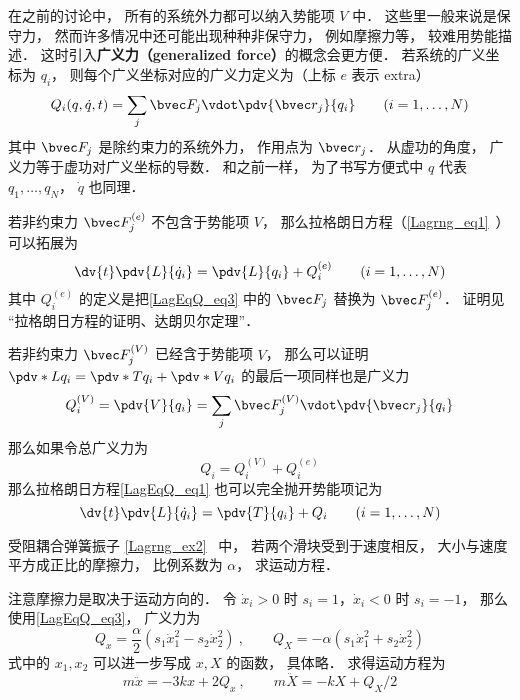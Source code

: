 

在之前的讨论中， 所有的系统外力都可以纳入势能项 $V$ 中． 这些里一般来说是保守力， 然而许多情况中还可能出现种种非保守力， 例如摩擦力等， 较难用势能描述． 这时引入\textbf{广义力（generalized force）}的概念会更方便． 若系统的广义坐标为 $q_i$， 则每个广义坐标对应的广义力定义为（上标 $e$ 表示 extra）
\begin{equation}\label{LagEqQ_eq3}
Q_i(q, \dot q, t) = \sum_j \bvec F_j \vdot \pdv{\bvec r_j}{q_i} \qquad (i=1,\dots,N)
\end{equation}
其中 $\bvec F_j$ 是除约束力的系统外力， 作用点为 $\bvec r_j$． 从虚功的角度， 广义力等于虚功对广义坐标的导数． 和之前一样， 为了书写方便式中 $q$ 代表 $q_1, \dots, q_N$， $\dot q$ 也同理．

若非约束力 $\bvec F_j^{(e)}$ 不包含于势能项 $V$， 那么拉格朗日方程（\autoref{Lagrng_eq1}~）可以拓展为
\begin{equation}\label{LagEqQ_eq1}
\dv{t} \pdv{L}{\dot q_i} = \pdv{L}{q_i} + Q_i^{(e)}
\qquad (i=1,\dots,N)
\end{equation}
其中 $Q_i^{(e)}$ 的定义是把\autoref{LagEqQ_eq3} 中的 $\bvec F_j$ 替换为 $\bvec F_j^{(e)}$． 证明见 “拉格朗日方程的证明、达朗贝尔定理”．

若非约束力 $\bvec F_j^{(V)}$ 已经含于势能项 $V$， 那么可以证明 $\pdv*{L}{q_i} = \pdv*{T}{q_i} + \pdv*{V}{q_i}$ 的最后一项同样也是广义力
\begin{equation}
Q_i^{(V)} = \pdv{V}{q_i} = \sum_j \bvec F_j^{(V)} \vdot \pdv{\bvec r_j}{q_i}
\end{equation}
那么如果令总广义力为
\begin{equation}
Q_i = Q_i^{(V)} + Q_i^{(e)}
\end{equation}
那么拉格朗日方程\autoref{LagEqQ_eq1} 也可以完全抛开势能项记为
\begin{equation}\label{LagEqQ_eq2}
\dv{t} \pdv{L}{\dot q_i} = \pdv{T}{q_i} + Q_i
\qquad (i=1,\dots,N)
\end{equation}

\begin{example}{受阻耦合弹簧振子}
\autoref{Lagrng_ex2}~ 中， 若两个滑块受到于速度相反， 大小与速度平方成正比的摩擦力， 比例系数为 $\alpha$， 求运动方程．

注意摩擦力是取决于运动方向的． 令 $\dot x_i > 0$ 时 $s_i = 1$，$\dot x_i < 0$ 时 $s_i = -1$， 那么使用\autoref{LagEqQ_eq3}， 广义力为
\begin{equation}
Q_x = \frac{\alpha}{2}(s_1\dot x_1^2 - s_2 \dot x_2^2)~, \qquad
Q_X = -\alpha(s_1 \dot x_1^2 + s_2\dot x_2^2)
\end{equation}
式中的 $x_1,x_2$ 可以进一步写成 $x, X$ 的函数， 具体略． 求得运动方程为
\begin{equation}
m\ddot x =  - 3kx + 2Q_x~, \qquad
m\ddot X =  - kX +Q_X/2
\end{equation}
\end{example}
